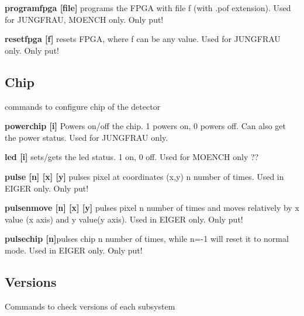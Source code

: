 \begin{DoxyItemize}
\item {\bfseries programfpga \mbox{[}file\mbox{]}} programs the FPGA with file f (with .pof extension). Used for JUNGFRAU, MOENCH only. Only put!
\end{DoxyItemize}


\begin{DoxyItemize}
\item {\bfseries resetfpga \mbox{[}f\mbox{]}} resets FPGA, where f can be any value. Used for JUNGFRAU only. Only put!
\end{DoxyItemize}\hypertarget{config_configchip}{}\subsection{Chip}\label{config_configchip}
commands to configure chip of the detector


\begin{DoxyItemize}
\item {\bfseries powerchip \mbox{[}i\mbox{]}} Powers on/off the chip. 1 powers on, 0 powers off. Can also get the power status. Used for JUNGFRAU only.
\end{DoxyItemize}


\begin{DoxyItemize}
\item {\bfseries led \mbox{[}i\mbox{]}} sets/gets the led status. 1 on, 0 off. Used for MOENCH only ??
\end{DoxyItemize}


\begin{DoxyItemize}
\item {\bfseries pulse \mbox{[}n\mbox{]} \mbox{[}x\mbox{]} \mbox{[}y\mbox{]}} pulses pixel at coordinates (x,y) n number of times. Used in EIGER only. Only put!
\end{DoxyItemize}


\begin{DoxyItemize}
\item {\bfseries pulsenmove \mbox{[}n\mbox{]} \mbox{[}x\mbox{]} \mbox{[}y\mbox{]}} pulses pixel n number of times and moves relatively by x value (x axis) and y value(y axis). Used in EIGER only. Only put!
\end{DoxyItemize}


\begin{DoxyItemize}
\item {\bfseries pulsechip \mbox{[}n\mbox{]}}pulses chip n number of times, while n=-\/1 will reset it to normal mode. Used in EIGER only. Only put!
\end{DoxyItemize}\hypertarget{config_configversions}{}\subsection{Versions}\label{config_configversions}
Commands to check versions of each subsystem


